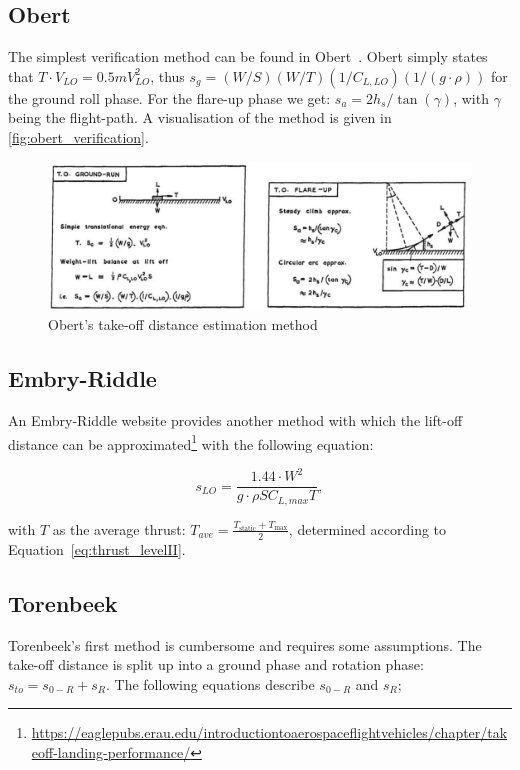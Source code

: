 \subsection{Obert}
The simplest verification method can be found in Obert~\cite{obert2009aerodynamic}. Obert simply states that $T \cdot V_{LO} = 0.5 m V_{LO}^2$, thus $s_g = (W/S)(W/T)(1/C_{L,LO})(1/(g\cdot\rho))$ for the ground roll phase. For the flare-up phase we get: $s_a = 2h_s/\tan{(\gamma)}$, with $\gamma$ being the flight-path. A visualisation of the method is given in \autoref{fig:obert_verification}.

\begin{figure}[!ht]
    \centering
    \includegraphics[width=0.75\linewidth]{figures/obert_takeoff.png}
    \caption{Obert's take-off distance estimation method}
    \label{fig:obert_verification}
\end{figure}

\subsection{Embry-Riddle}
An Embry-Riddle website provides another method with which the lift-off distance can be approximated\footnote{\url{https://eaglepubs.erau.edu/introductiontoaerospaceflightvehicles/chapter/takeoff-landing-performance/}} with the following equation: 

\begin{equation}\label{eq:s_LO}
    s_{LO} = \frac{1.44 \cdot W^2}{g \cdot \rho S C_{L,max}T},
\end{equation}

with $T$ as the average thrust: $T_{ave} = \frac{T_\text{static}+T_\text{max}}{2}$, determined according to Equation~\eqref{eq:thrust_levelII}.

\subsection{Torenbeek}
Torenbeek's first method is cumbersome and requires some assumptions. The take-off distance is split up into a ground phase and rotation phase: $s_{to} = s_{0-R}+s_R$. The following equations describe $s_{0-R}$ and $s_R$;

